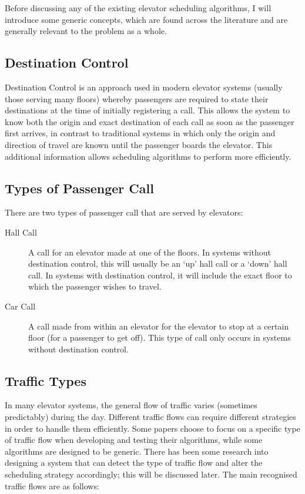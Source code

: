 \documentclass{UoYCSproject}
\begin{document}
Before discussing any of the existing elevator scheduling algorithms, I will introduce some generic concepts, which are found across the literature and are generally relevant to the problem as a whole.

\subsection{Destination Control}

Destination Control is an approach used in modern elevator systems (usually those serving many floors) whereby passengers are required to state their destinations at the time of initially registering a call.  This allows the system to know both the origin and exact destination of each call as soon as the passenger first arrives, in contrast to traditional systems in which only the origin and direction of travel are known until the passenger boards the elevator.  This additional information allows scheduling algorithms to perform more efficiently.  \citep{Koehler2002}

\subsection{Types of Passenger Call}

There are two types of passenger call that are served by elevators:  \citep{Gagov2001, Bao1994}

\begin{description}
	\item[Hall Call] A call for an elevator made at one of the floors.  In systems without destination control, this will usually be an `up' hall call or a `down' hall call.  In systems with destination control, it will include the exact floor to which the passenger wishes to travel.
	\item[Car Call] A call made from within an elevator for the elevator to stop at a certain floor (for a passenger to get off).  This type of call only occurs in systems without destination control.
\end{description}

\subsection{Traffic Types}

In many elevator systems, the general flow of traffic varies (sometimes predictably) during the day.  Different traffic flows can require different strategies in order to handle them efficiently.  Some papers choose to focus on a specific type of traffic flow when developing and testing their algorithms, while some algorithms are designed to be generic.  There has been some research into designing a system that can detect the type of traffic flow and alter the scheduling strategy accordingly; this will be discussed later.  The main recognised traffic flows are as follows:  \citep{Nikovski2003, Brand2004, Rong2003, Smith2002, Collins1993Patent, Bao1994, Pepyne1997}
\end{document}
